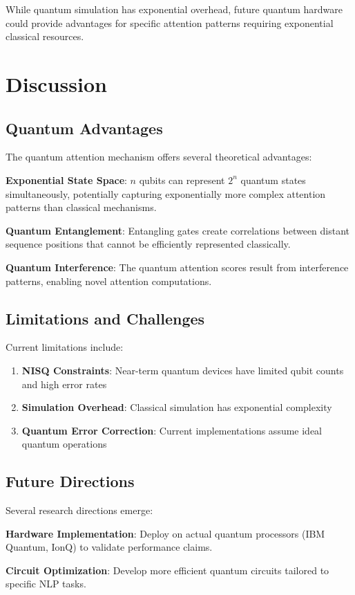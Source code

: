 \documentclass[11pt,twocolumn]{article}
\begin{document}
While quantum simulation has exponential overhead, future quantum hardware could provide advantages for specific attention patterns requiring exponential classical resources.

\section{Discussion}

\subsection{Quantum Advantages}
The quantum attention mechanism offers several theoretical advantages:

\textbf{Exponential State Space}: $n$ qubits can represent $2^n$ quantum states simultaneously, potentially capturing exponentially more complex attention patterns than classical mechanisms.

\textbf{Quantum Entanglement}: Entangling gates create correlations between distant sequence positions that cannot be efficiently represented classically.

\textbf{Quantum Interference}: The quantum attention scores result from interference patterns, enabling novel attention computations.

\subsection{Limitations and Challenges}
Current limitations include:
\begin{enumerate}
    \item \textbf{NISQ Constraints}: Near-term quantum devices have limited qubit counts and high error rates
    \item \textbf{Simulation Overhead}: Classical simulation has exponential complexity
    \item \textbf{Quantum Error Correction}: Current implementations assume ideal quantum operations
\end{enumerate}

\subsection{Future Directions}
Several research directions emerge:

\textbf{Hardware Implementation}: Deploy on actual quantum processors (IBM Quantum, IonQ) to validate performance claims.

\textbf{Circuit Optimization}: Develop more efficient quantum circuits tailored to specific NLP tasks.
\end{document}
